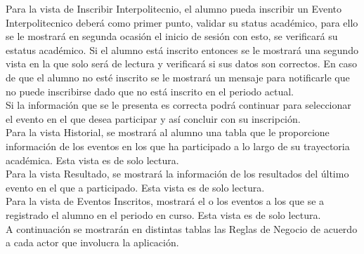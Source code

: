 	Para la vista de Inscribir Interpolitecnio, el alumno pueda inscribir un Evento Interpolitecnico deberá como primer punto, validar su status académico, para ello se le mostrará en segunda ocasión el inicio de sesión con esto, se verificará su estatus académico. Si el alumno está inscrito entonces se le mostrará una segundo vista en la que solo será de lectura y verificará si sus datos son correctos. En caso de que el alumno no esté inscrito se le mostrará un mensaje para notificarle que no puede inscribirse dado que no está inscrito en el periodo actual. \\
	Si la información que se le presenta es correcta podrá continuar para seleccionar el evento en el que desea participar y así concluir con su inscripción. \\
	
	Para la vista Historial, se mostrará al alumno una tabla que le proporcione información de los eventos en los que ha participado a lo largo de su trayectoria académica. Esta vista es de solo lectura.\\
	
	Para la vista Resultado, se mostrará la información de los resultados del último evento en el que a participado. Esta vista es de solo lectura.\\
	
	Para la vista de Eventos Inscritos, mostrará el o los eventos a los que se a registrado el alumno en el periodo en curso. Esta vista es de solo lectura.\\
	
	\noindent A continuación se mostrarán en distintas tablas las Reglas de Negocio de acuerdo a cada actor que involucra la aplicación.
	
